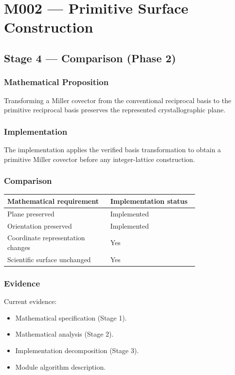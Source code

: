 
\chapter{M002 --- Primitive Surface Construction}

\section{Stage 4 --- Comparison (Phase 2)}

\subsection{Mathematical Proposition}

Transforming a Miller covector from the conventional reciprocal basis to
the primitive reciprocal basis preserves the represented crystallographic
plane.

\subsection{Implementation}

The implementation applies the verified basis transformation to obtain a
primitive Miller covector before any integer-lattice construction.

\subsection{Comparison}

\begin{center}
\begin{tabular}{|p{0.42\linewidth}|p{0.36\linewidth}|}
\hline
Mathematical requirement & Implementation status\\
\hline
Plane preserved & Implemented\\
Orientation preserved & Implemented\\
Coordinate representation changes & Yes\\
Scientific surface unchanged & Yes\\
\hline
\end{tabular}
\end{center}

\subsection{Evidence}

Current evidence:

\begin{itemize}
\item Mathematical specification (Stage 1).
\item Mathematical analysis (Stage 2).
\item Implementation decomposition (Stage 3).
\item Module algorithm description.
\end{itemize}

